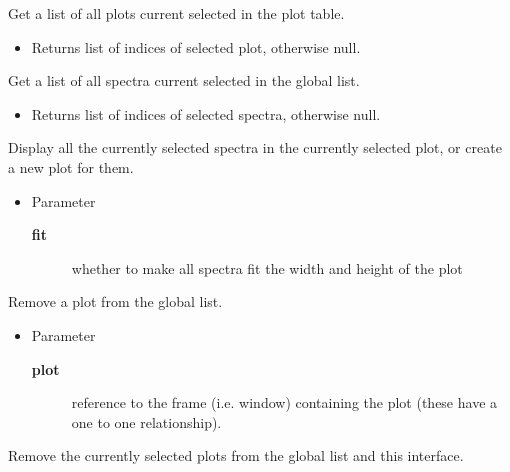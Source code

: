 \begin{desc}Get a list of all plots current selected in the plot table.
\begin{itemize}
\item{Returns list of indices of selected plot, otherwise null. }
\end{itemize}
\end{desc}

\begin{desc}Get a list of all spectra current selected in the global list.
\begin{itemize}
\item{Returns list of indices of selected spectra, otherwise null. }
\end{itemize}
\end{desc}

\begin{desc}Display all the currently selected spectra in the currently
 selected plot, or create a new plot for them.
\begin{itemize}
\item{Parameter
  \begin{description}
   \item[\textbf{fit}]{whether to make all spectra fit the width and height
            of the plot}
  \end{description}}
\end{itemize}
\end{desc}

\begin{desc}Remove a plot from the global list.
\begin{itemize}
\item{Parameter
  \begin{description}
   \item[\textbf{plot}]{reference to the frame (i.e. window) containing the
             plot (these have a one to one relationship).}
  \end{description}}
\end{itemize}
\end{desc}

\begin{desc}Remove the currently selected plots from the global list and
 this interface.
\end{desc}

